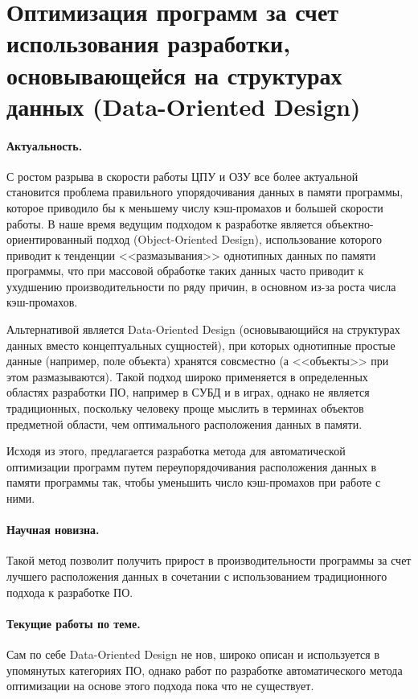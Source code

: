 \documentclass[a4paper,12pt,notitlepage]{article}
\begin{document}
\section{Оптимизация программ за счет использования разработки, основывающейся на
  структурах данных (Data-Oriented Design)}
\label{sec:data-driven-design}

\paragraph{Актуальность.}
С ростом разрыва в скорости работы ЦПУ и ОЗУ все более актуальной становится проблема
правильного упорядочивания данных в памяти программы, которое приводило бы к меньшему
числу кэш-промахов и большей скорости работы. В наше время ведущим подходом к разработке
является объектно-ориентированный подход (Object-Oriented Design), использование которого
приводит к тенденции <<размазывания>> однотипных данных по памяти программы, что при
массовой обработке таких данных часто приводит к ухудшению производительности по ряду
причин, в основном из-за роста числа кэш-промахов. 

Альтернативой является Data-Oriented Design (основывающийся на структурах данных вместо
концептуальных сущностей), при которых однотипные простые данные (например, поле объекта)
хранятся совсместно (а <<объекты>> при этом размазываются). Такой подход широко
применяется в определенных областях разработки ПО, например в СУБД и в играх, однако не
является традиционных, поскольку человеку проще мыслить в терминах объектов предметной
области, чем оптимального расположения данных в памяти.

Исходя из этого, предлагается разработка метода для автоматической оптимизации программ
путем переупорядочивания расположения данных в памяти программы так, чтобы уменьшить число
кэш-промахов при работе с ними.

\paragraph{Научная новизна.}
Такой метод позволит получить прирост в производительности программы за счет лучшего
расположения данных в сочетании с использованием традиционного подхода к разработке ПО.

\paragraph{Текущие работы по теме.}
Сам по себе Data-Oriented Design не нов, широко описан и используется в упомянутых
категориях ПО, однако работ по разработке автоматического метода оптимизации на основе
этого подхода пока что не существует.
\end{document}
